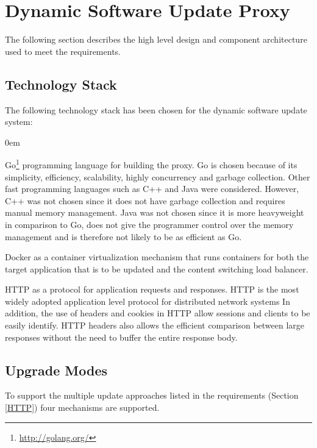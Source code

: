 \documentclass[a4paper,11pt,twoside]{report}
\begin{document}
\section{Dynamic Software Update Proxy} 

The following section describes the high level design and component architecture used to meet the requirements.

\subsection{Technology Stack} 
The following technology stack has been chosen for the dynamic software update system:

\begin{list}{-}{}
  \itemsep0em
  \item Go\footnote{\url{http://golang.org/}} programming language for building the proxy. Go is chosen because of its simplicity, efficiency, scalability, highly concurrency and garbage collection. Other fast programming languages such as C++ and Java were considered. However, C++ was not chosen since it does not have garbage collection and requires manual memory management. Java was not chosen since it is more heavyweight in comparison to Go, does not give the programmer control over the memory management and is therefore not likely to be as efficient as Go.
    
  \item Docker as a container virtualization mechanism that runs containers for both the target application that is to be updated and the content switching load balancer.
   
  \item HTTP as a protocol for application requests and responses.  HTTP is the most widely adopted application level protocol for distributed network systems In addition, the use of headers and cookies in HTTP allow sessions and clients to be easily identify.  HTTP headers also allows the efficient comparison between large responses without the need to buffer the entire response body.
\end{list}
  
\subsection{Upgrade Modes}\label{modes}
  
To support the multiple update approaches listed in the requirements (Section \ref{HTTP}) four mechanisms are supported.
\end{document}
